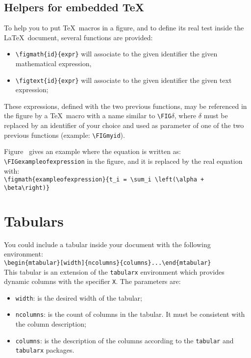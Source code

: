 \documentclass[book,taskpackage,specpackage,codepackage]{upmethodology-document}
\begin{document}
\subsection{Helpers for embedded \TeX}

To help you to put \TeX\ macros in a figure, and to define its real test inside the \LaTeX\ document, several functions are provided:
\begin{itemize}
\item \texttt{{\textbackslash}figmath\{id\}\{expr\}} will associate to the given identifier the given mathematical expression,
\item \texttt{{\textbackslash}figtext\{id\}\{expr\}} will associate to the given identifier the given text expression;
\end{itemize}

These expressions, defined with the two previous functions, may be referenced in the figure by a \TeX\ macro with a name similar to \texttt{{\textbackslash}FIG$\delta$}, where $\delta$ must be replaced by an identifier of your choice and used as parameter of one of the two previous functions (example: \texttt{{\textbackslash}FIGmyid}).

Figure~ gives an example where the equation is written as: \texttt{{\textbackslash}FIGexampleofexpression} in the figure, and it is replaced by the real equation with: \\
\texttt{{\textbackslash}figmath\{exampleofexpression\}\{t\_i = {\textbackslash}sum\_i {\textbackslash}left({\textbackslash}alpha + {\textbackslash}beta{\textbackslash}right)\}}



\section{Tabulars}

You could include a tabular inside your document with the following environment: \\
\texttt{{\textbackslash}begin\{mtabular\}[width]\{ncolumns\}\{columns\}...{\textbackslash}end\{mtabular\}} \\

This tabular is an extension of the \texttt{tabularx} environment which provides dynamic columns with the specifier \texttt{X}. The parameters are:
\begin{itemize}
\item \texttt{width}: is the desired width of the tabular;

\item \texttt{ncolumns}: is the count of columns in the tabular. It must be consistent with the column description;

\item \texttt{columns}: is the description of the columns according to the \texttt{tabular} and \texttt{tabularx} packages.

\end{itemize}
\end{document}
